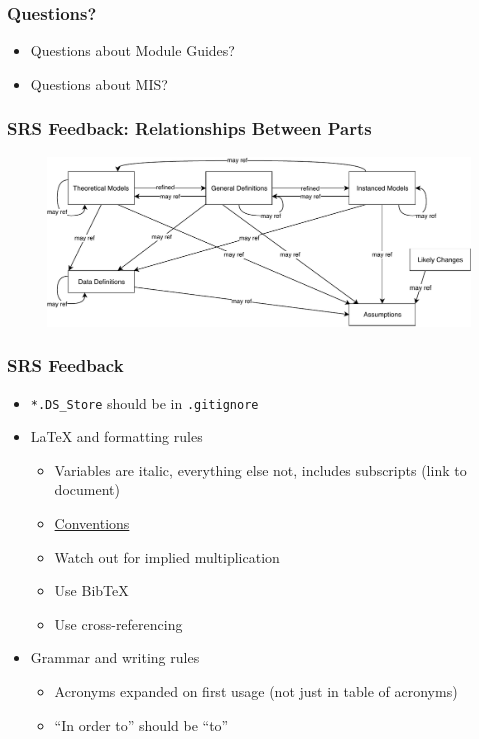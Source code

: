 \documentclass[t,12pt,numbers,fleqn]{beamer}
\begin{document}

\begin{frame}
\frametitle{Questions?}
\begin{itemize}
\item Questions about Module Guides?
\item Questions about MIS?
\end{itemize}
\end{frame}


\begin{frame}
  
\frametitle{SRS Feedback: Relationships Between Parts}

\begin{figure}[H]
  \includegraphics[scale=0.59]{../Figures/RelationsBetweenTM_GD_IM_DD_A.pdf}
\end{figure}

\end{frame}


\begin{frame}

\frametitle{SRS Feedback}

\begin{itemize}
\item \texttt{*.DS\_Store} should be in \texttt{.gitignore}
\item \LaTeX{} and formatting rules
\begin{itemize}
\item Variables are italic, everything else not, includes subscripts (link to
  document)
\bi
\item \href{https://physics.nist.gov/cuu/pdf/typefaces.pdf}{Conventions}
\item Watch out for implied multiplication
\ei
\item Use BibTeX
\item Use cross-referencing
\end{itemize}
\item Grammar and writing rules
\begin{itemize}
\item Acronyms expanded on first usage (not just in table of acronyms)
\item ``In order to'' should be ``to''
\end{itemize}
\end{itemize}
\end{frame}
\end{document}
